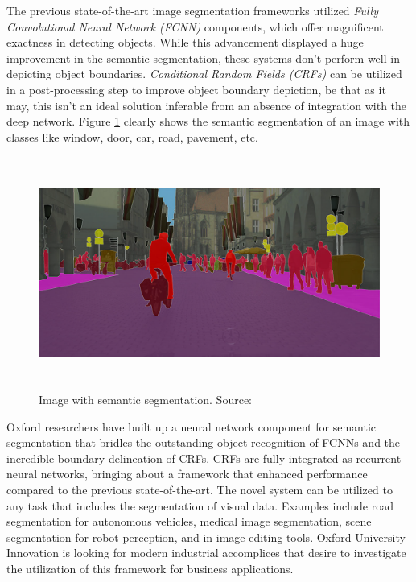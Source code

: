 The previous state-of-the-art image segmentation frameworks utilized \textit{Fully Convolutional Neural Network (FCNN)} components, which offer magnificent exactness in detecting objects. While this advancement displayed a huge improvement in the semantic segmentation, these systems don't perform well in depicting object boundaries. \textit{Conditional Random Fields  (CRFs)} can be utilized in a post-processing
step to improve object boundary depiction, be that as it may, this isn't an ideal solution inferable from an absence of integration with the deep network. Figure \ref{fig:semantic} clearly shows the semantic segmentation of an image with classes like window, door, car, road, pavement, etc.



\begin{figure}[H]
  \centering
  \includegraphics[height=3in]{images/semantic.png}
   \caption{Image with semantic segmentation. Source:\cite{DBLP:journals/corr/abs-1809-10198}}
   \label{fig:semantic}
\end{figure}
Oxford researchers have built up a neural network component for semantic segmentation that bridles the outstanding object recognition of FCNNs and the incredible boundary delineation of CRFs. CRFs are fully integrated as recurrent neural networks, bringing about a framework that enhanced performance compared to the previous state-of-the-art. The novel system can be utilized to any task that includes the segmentation of visual data. Examples include road segmentation for autonomous vehicles, medical image segmentation, scene segmentation for robot perception, and in image editing tools. Oxford University Innovation is looking for modern industrial accomplices that desire to investigate the utilization of this framework for business applications.

